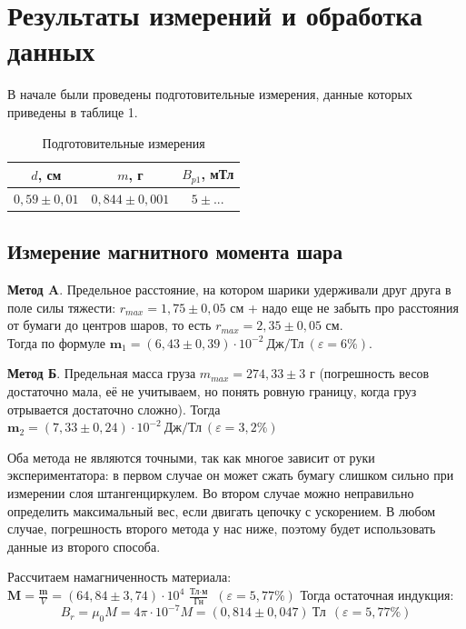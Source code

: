 \documentclass[a4paper, 12pt]{article}
\begin{document}
	\vspace{2cm}
	
	\section*{Результаты измерений и обработка данных}
	В начале были проведены подготовительные измерения, данные которых приведены в таблице 1.
	\begin{table}[H]
		\centering
		\begin{tabular}{|c|c|c|}
			\hline $d$, см & $m$, г & $B_{p1}$, мТл \\ \hline
			$0,59 \pm 0,01$   & $0,844 \pm 0,001$ &  $5 \pm ...$  \\ \hline
		\end{tabular}
		\caption{Подготовительные измерения}
		\label{prep}
	\end{table}
	\subsection*{Измерение магнитного момента шара}
	
	\textbf{Метод $\mathbf{A}$}. Предельное расстояние, на котором шарики удерживали друг друга в поле силы тяжести: $r_{max} = 1,75 \pm 0,05$ см + надо еще не забыть про расстояния от бумаги до центров шаров, то есть $r_{max}  = 2,35 \pm 0,05$ см.\\ Тогда по формуле $\mathbf{m}_1 = (6,43 \pm 0,39) \cdot 10^{-2} \ \text{Дж}/\text{Тл} \ (\varepsilon = 6 \%)$.
	
	\textbf{Метод Б}. Предельная масса груза $m_{max}=  274,33 \pm 3 $ г (погрешность весов достаточно мала, её не учитываем, но понять ровную границу, когда груз отрывается достаточно сложно). Тогда $\mathbf{m}_2 = (7,33 \pm 0,24) \cdot 10^{-2}  \ \text{Дж}/\text{Тл} \ (\varepsilon = 3,2 \%)$
	
	Оба метода не являются точными, так как многое зависит от руки экспериментатора: в первом случае он может сжать бумагу слишком сильно при измерении слоя штангенциркулем. Во втором случае можно неправильно определить максимальный вес, если двигать цепочку с ускорением. В любом случае, погрешность второго метода у нас ниже, поэтому будет использовать данные из второго способа.
	
	Рассчитаем намагниченность материала: $\mathbf{M} = \frac{\mathbf{m}}{V} = 	(64,84 \pm 3,74) \cdot 10^4 \ \frac{\text{Тл} \cdot \text{м}}{\text{Гн}} \ \ (\varepsilon = 5,77 \%)$
	Тогда остаточная индукция: 
	\[B_r = \mu_0 M = 4\pi \cdot 10^{-7} M = (0,814 \pm 0,047) \ \text{Тл} \ \ (\varepsilon = 5,77 \%) \]
	
\end{document}

